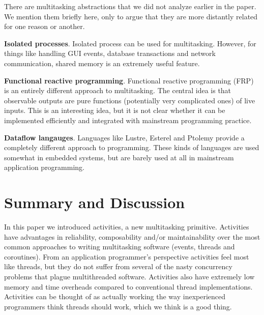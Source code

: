 \documentclass[preprint, 10pt, numbers]{sigplanconf}
\begin{document}
There are multitasking abstractions that we did not analyze earlier in the paper.
We mention them briefly here, only to argue that they are more distantly related for one reason or another.

\textbf{Isolated processes}.
Isolated process can be used for multitasking.
However, for things like handling GUI events, database transactions and network communication, shared memory is an extremely useful feature.

\textbf{Functional reactive programming}.
Functional reactive programming (FRP) is an entirely different approach to multitasking.
The central idea is that observable outputs are pure functions (potentially very complicated ones) of live inputs.
This is an interesting idea, but it is not clear whether it can be implemented efficiently and integrated with mainstream programming practice.

\textbf{Dataflow langauges}.
Languages like Lustre, Esterel and Ptolemy provide a completely different approach to programming.
These kinds of languages are used somewhat in embedded systems, but are barely used at all in mainstream application programming.

\section{Summary and Discussion}

In this paper we introduced activities, a new multitasking primitive.
Activities have advantages in reliability, composability and/or maintainability over the most common approaches to writing multitasking software (events, threads and coroutines).
From an application programmer's perspective activities feel most like threads, but they do not suffer from several of the nasty concurrency problems that plague multithreaded software.
Activities also have extremely low memory and time overheads compared to conventional thread implementations.
Activities can be thought of as actually working the way inexperienced programmers think threads should work, which we think is a good thing.




% 






\end{document}
